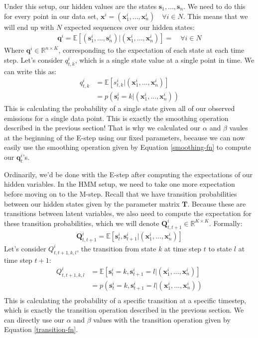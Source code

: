 Under this setup, our hidden values are the states $\textbf{s}_1, ..., \textbf{s}_n$. We need to do this for every point in our data set, $\textbf{x}^i = (\textbf{x}_1^i, ..., \textbf{x}_n^i) \quad \forall i \in N$. This means that we will end up with $N$ expected sequences over our hidden states:
\begin{align*}
	\textbf{q}^i = \mathbb{E}[(\textbf{s}_1^i, ..., \textbf{s}_n^i) | (\textbf{x}_1^i, ..., \textbf{x}_n^i)] = \quad \forall i \in N
\end{align*}
Where $\textbf{q}^i \in \mathbb{R}^{n \times K}$, corresponding to the expectation of each state at each time step. Let's consider $q_{t, k}^i$, which is a single state value at a single point in time. We can write this as:
\begin{align}
	q_{t, k}^i &= \mathbb{E}[s_{t, k}^i | (\textbf{x}_1^i, ..., \textbf{x}_n^i)] \\
	&= p(\textbf{s}_{t}^i = k | (\textbf{x}_1^i, ..., \textbf{x}_n^i))
\end{align}
This is calculating the probability of a single state given all of our observed emissions for a single data point. This is exactly the smoothing operation described in the previous section! That is why we calculated our $\alpha$ and $\beta$ vaules at the beginning of the E-step using our fixed parameters, because we can now easily use the smoothing operation given by Equation \ref{smoothing-fn} to compute our $\textbf{q}_t^i$'s.

Ordinarily, we'd be done with the E-step after computing the expectations of our hidden variables. In the HMM setup, we need to take one more expectation before moving on to the M-step. Recall that we have transition probabilities between our hidden states given by the parameter matrix $\textbf{T}$. Because these are transitions between latent variables, we also need to compute the expectation for these transition probabilities, which we will denote $\textbf{Q}_{t, t+1}^i \in \mathbb{R}^{K \times K}$. Formally:
\begin{align}
	\textbf{Q}_{t, t+1}^i = \mathbb{E}[\textbf{s}_t^i, \textbf{s}_{t+1}^i | (\textbf{x}_1^i, ..., \textbf{x}_n^i)]
\end{align}
Let's consider $Q_{t, t+1, k, l}^i$, the transition from state $k$ at time step $t$ to state $l$ at time step $t+1$:
\begin{align}
	Q_{t, t+1, k, l}^i &= \mathbb{E}[\textbf{s}_{t}^i = k, \textbf{s}_{t+1}^i = l | (\textbf{x}_1^i, ..., \textbf{x}_n^i)] \\
	&= p(\textbf{s}_{t}^i = k, \textbf{s}_{t+1}^i = l | (\textbf{x}_1^i, ..., \textbf{x}_n^i)) \\
\end{align}
This is calculating the probability of a specific transition at a specific timestep, which is exactly the transition operation described in the previous section. We can directly use our $\alpha$ and $\beta$ values with the transition operation given by Equation \ref{transition-fn}.

